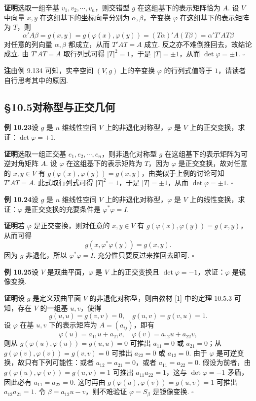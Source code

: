 \documentclass[UTF8,12pt,a4paper,fontset=fandol]{ctexart}
\begin{document}
\noindent\textbf{证明}\quad 选取一组辛基 $v_1,v_2,\cdots,v_n$，则交错型 $g$ 在这组基下的表示矩阵恰为 $A$. 设 $V$ 中向量 $x,y$ 在这组基下的坐标向量分别为 $\alpha,\beta$，辛变换 $\varphi$ 在这组基下的表示矩阵为 $T$，则
\[
\alpha'A\beta=g(x,y)=g(\varphi(x),\varphi(y))=(T\alpha)'A(T\beta)=\alpha'T'AT\beta
\]
对任意的列向量 $\alpha,\beta$ 都成立，从而 $T'AT=A$ 成立. 反之亦不难倒推回去，故结论成立. 由 $T'AT=A$ 取行列式可得 $|T|^2=1$，于是 $|T|=\pm1$，从而 $\det\varphi=\pm1$. $\square$

\noindent\textbf{注}\quad 由例 9.134 可知，实辛空间 $(V,g)$ 上的辛变换 $\varphi$ 的行列式值等于 $1$，请读者自行思考其中的原因.

\subsection*{§10.5\quad 对称型与正交几何}

\noindent\textbf{例 10.23}\quad 设 $g$ 是 $n$ 维线性空间 $V$ 上的非退化对称型，$\varphi$ 是 $V$ 上的正交变换，求证：$\det\varphi=\pm1$.

\noindent\textbf{证明}\quad 选取一组正交基 $e_1,e_2,\cdots,e_n$，则非退化对称型 $g$ 在这组基下的表示矩阵为可逆对角矩阵 $A$. 设 $\varphi$ 在这组基下的表示矩阵为 $T$，因为 $\varphi$ 是正交变换，故对任意的 $x,y\in V$ 有 $g(\varphi(x),\varphi(y))=g(x,y)$，由类似于上例的讨论可知 $T'AT=A$. 此式取行列式可得 $|T|^2=1$，于是 $|T|=\pm1$，从而 $\det\varphi=\pm1$. $\square$

\noindent\textbf{例 10.24}\quad 设 $g$ 是 $n$ 维线性空间 $V$ 上的非退化对称型，$\varphi$ 是 $V$ 上的线性变换，求证：$\varphi$ 是正交变换的充要条件是 $\varphi^*\varphi=I$.

\noindent\textbf{证明}\quad 若 $\varphi$ 是正交变换，则对任意的 $x,y\in V$ 有 $g(\varphi(x),\varphi(y))=g(x,y)$，从而可得
\[
g(x,\varphi^*\varphi(y))=g(x,y).
\]
因为 $g$ 非退化，所以 $\varphi^*\varphi=I$. 充分性只要反过来推回去即可. $\square$

\noindent\textbf{例 10.25}\quad 设 $V$ 是双曲平面，$\varphi$ 是 $V$ 上的正交变换且 $\det\varphi=-1$，求证：$\varphi$ 是镜像变换.

\noindent\textbf{证明}\quad 设 $g$ 是定义双曲平面 $V$ 的非退化对称型，则由教材 [1] 中的定理 10.5.3 可知，存在 $V$ 的一组基 $u,v$，使得
\[
g(u,u)=g(v,v)=0,\quad g(u,v)=g(v,u)=1.
\]
设 $\varphi$ 在基 $u,v$ 下的表示矩阵为 $A=(a_{ij})$，即有
\[
\varphi(u)=a_{11}u+a_{21}v,\quad \varphi(v)=a_{12}u+a_{22}v,
\]
则从 $g(\varphi(u),\varphi(u))=g(u,u)=0$ 可推出 $a_{11}=0$ 或 $a_{21}=0$；从 $g(\varphi(v),\varphi(v))=g(v,v)=0$ 可推出 $a_{22}=0$ 或 $a_{12}=0$. 由于 $\varphi$ 是可逆变换，故只有下列可能性：或者 $a_{12}=a_{21}=0$，或者 $a_{11}=a_{22}=0$. 假设为前者，由 $g(\varphi(u),\varphi(v))=g(u,v)=1$ 可推出 $a_{11}a_{22}=1$，这与 $\det\varphi=-1$ 矛盾，因此必有 $a_{11}=a_{22}=0$. 这时再由 $g(\varphi(u),\varphi(v))=g(u,v)=1$ 可推出 $a_{12}a_{21}=1$. 令 $\beta=a_{12}u-v$，则不难验证 $\varphi=S_\beta$ 是镜像变换. $\square$
\end{document}
